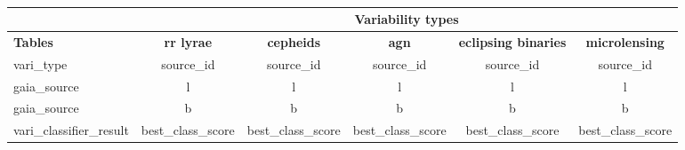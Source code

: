 \documentclass[12pt,a4paper]{article}
\begin{document}
\hfill
\hfill \\




\begin{table}[h]
    \begin{subtable}[h]{0.45\textwidth}
        \centering
       \tiny
\begin{tabular}{lccccc}
\cline{2-6}
                                              & \multicolumn{5}{c}{\textbf{Variability types}}                                                                                                                                                                                                                        \\ \hline \hline
\multicolumn{1}{l|}{\textbf{Tables}}          & \textbf{rr lyrae}                                                                  & \textbf{cepheids}                                                                  & \textbf{agn} & \textbf{eclipsing binaries}       & \textbf{microlensing} \\ \hline
\multicolumn{1}{l|}{vari\_type}               & source\_id                                                                         & source\_id                                                                         &           source\_id                          &   source\_id                                    &    source\_id                       \\
\multicolumn{1}{l|}{gaia\_source}             & l                                                                                  & l                                                                                  &                                l &              l                     &                l       \\
\multicolumn{1}{l|}{gaia\_source}             & b                                                                                  & b                                                                                  &                                b &                    b               &         b              \\
\multicolumn{1}{l|}{vari\_classifier\_result} & best\_class\_score                                                                 & best\_class\_score                                                                 &  best\_class\_score                                 &       best\_class\_score                              &    best\_class\_score                     \\

\end{tabular}
\end{subtable}
\end{table}
\end{document}
